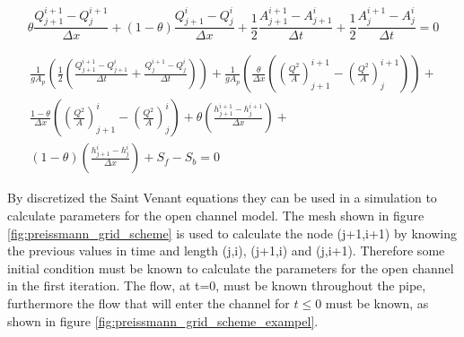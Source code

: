 \begin{equation}\label{eq:continuity_eq_preissmann}
	\theta \frac{Q_{j+1}^{i+1}-Q_j^{i+1}}{\Delta x}+(1-\theta)\frac{Q_{j+1}^i - Q_j^i}{\Delta x}+
	\frac{1}{2}\frac{A_{j+1}^{i+1}-A_{j+1}^i}{\Delta t} + \frac{1}{2} \frac{A_{j}^{i+1} - A_j^i}{\Delta t} = 0
\end{equation}

\begin{multline}
	\frac{1}{gA_p}\left(\frac{1}{2} \left(\frac{Q_{j+1}^{i+1}-Q_{j+1}^i}{\Delta t}+\frac{Q_{j}^{i+1} - Q_j^i}{\Delta t}\right)\right) + \frac{1}{gA_p}\left(\frac{\theta}{\Delta x} \left(\left(\frac{Q^2}{A}\right)_{j+1}^{i+1}-\left(\frac{Q^2}{A}\right)_{j}^{i+1}\right)\right) + \\ \frac{1-\theta}{\Delta x}\left(\left(\frac{Q^2}{A}\right)_{j+1}^{i}-\left(\frac{Q^2}{A}\right)_{j}^{i}\right)+\theta \left(\frac{h_{j+1}^{i+1}-h_j^{i+1}}{\Delta x}\right)+ \\ (1-\theta)\left(\frac{h_{j+1}^{i} - h_j^i}{\Delta x}\right)+S_f-S_b= 0
\end{multline}

By discretized the Saint Venant equations they can be used in a simulation to calculate parameters for the open channel model. The mesh shown in figure \ref{fig:preissmann_grid_scheme} is used to calculate the node (j+1,i+1) by knowing the previous values in time and length (j,i), (j+1,i) and (j,i+1). Therefore some initial condition must be known to calculate the parameters for the open channel in the first iteration. The flow, at t=0, must be known throughout the pipe, furthermore the flow that will enter the channel for $t\leq 0$ must be known, as shown in figure \ref{fig:preissmann_grid_scheme_exampel}.

